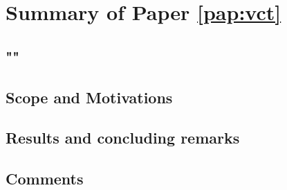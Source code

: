\section{Summary of Paper \ref{pap:vct}}
\subsection*{""}
\subsection*{Scope and Motivations}

\subsection*{Results and concluding remarks}
\subsection*{Comments}
\clearpage